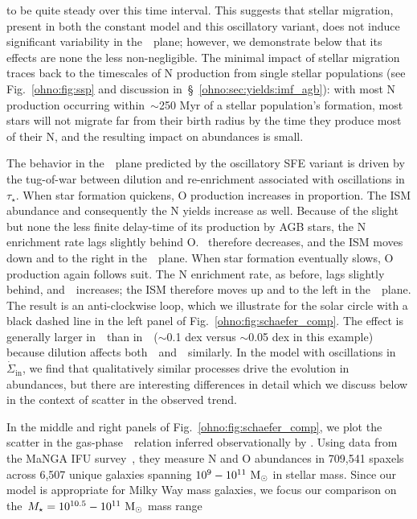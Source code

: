 to be quite steady over this time interval.
This suggests that stellar migration, present in both the constant model and
this oscillatory variant, does not induce significant variability in
the~\ohno~plane; however, we demonstrate below that its effects are none the
less non-negligible.
The minimal impact of stellar migration traces back to the timescales of N
production from single stellar populations (see Fig.~\ref{ohno:fig:ssp} and
discussion in~\S~\ref{ohno:sec:yields:imf_agb}): with most N production occurring
within~$\sim$250 Myr of a stellar population's formation, most stars will not
migrate far from their birth radius by the time they produce most of their N,
and the resulting impact on abundances is small.
\par
The behavior in the~\ohno~plane predicted by the oscillatory SFE variant
is driven by the tug-of-war between dilution and re-enrichment
associated with oscillations in~$\tau_\star$.
When star formation quickens, O production increases in proportion.
The ISM abundance and consequently the N yields increase as well.
Because of the slight but none the less finite delay-time of its production by
AGB stars, the N enrichment rate lags slightly behind O.
\no~therefore decreases, and the ISM moves down and to the right in
the~\ohno~plane.
When star formation eventually slows, O production again follows suit.
The N enrichment rate, as before, lags slightly behind, and~\no~increases; the
ISM therefore moves up and to the left in the~\ohno~plane.
The result is an anti-clockwise loop, which we illustrate for the solar circle
with a black dashed line in the left panel of Fig.~\ref{ohno:fig:schaefer_comp}.
The effect is generally larger in~\oh~than in~\no~($\sim$0.1 dex versus
$\sim$0.05 dex in this example) because dilution affects
both~\oh~and~\nh~similarly.
In the model with oscillations in~$\dot{\Sigma}_\text{in}$, we find that
qualitatively similar processes drive the evolution in abundances, but there
are interesting differences in detail which we discuss below in the context of
scatter in the observed trend.
\par
In the middle and right panels of Fig.~\ref{ohno:fig:schaefer_comp}, we plot the
scatter in the gas-phase~\ohno~relation inferred observationally by
\citet{Schaefer2020}.
Using data from the MaNGA IFU survey~\citep{Bundy2015}, they measure N and O
abundances in 709,541 spaxels across 6,507 unique galaxies spanning
$10^9 - 10^{11}~\text{M}_\odot$ in stellar mass.
Since our model is appropriate for Milky Way mass galaxies, we focus our
comparison on the~$M_\star = 10^{10.5} - 10^{11}~\text{M}_\odot$ mass range
